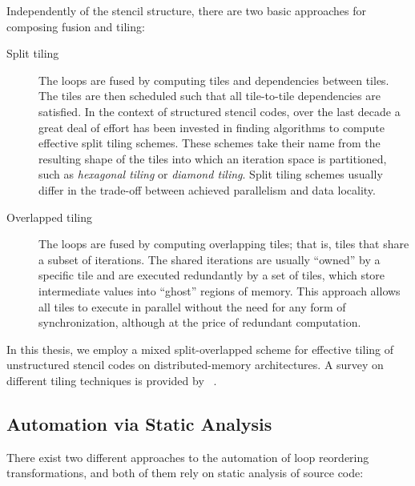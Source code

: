 Independently of the stencil structure, there are two basic approaches for composing fusion and tiling:
\begin{description}
\item[Split tiling] The loops are fused by computing tiles and dependencies between tiles. The tiles are then scheduled such that all tile-to-tile dependencies are satisfied. In the context of structured stencil codes, over the last decade a great deal of effort has been invested in finding algorithms to compute effective split tiling schemes. These schemes take their name from the resulting shape of the tiles into which an iteration space is partitioned, such as {\em hexagonal tiling} or {\em diamond tiling}. Split tiling schemes usually differ in the trade-off between achieved parallelism and data locality.
\item[Overlapped tiling] The loops are fused by computing overlapping tiles; that is, tiles that share a subset of iterations. The shared iterations are usually ``owned'' by a specific tile and are executed redundantly by a set of tiles, which store intermediate values into ``ghost'' regions of memory. This approach allows all tiles to execute in parallel without the need for any form of synchronization, although at the price of redundant computation. 
\end{description}
In this thesis, we employ a mixed split-overlapped scheme for effective tiling of unstructured stencil codes on distributed-memory architectures. A survey on different tiling techniques is provided by ~\cite{survey-tile-shape}. 


\subsection{Automation via Static Analysis}
\label{sec:bkg:poly}
There exist two different approaches to the automation of loop reordering transformations, and both of them rely on static analysis of source code:

